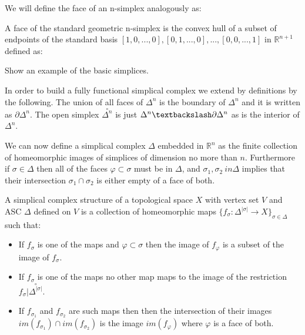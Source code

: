 We will define the face of an n-simplex analogously as:

\begin{defn} A face of the standard geometric n-simplex is the convex hull of a subset of endpoints of the standard basis $[1, 0, ..., 0], [0, 1, ..., 0], ..., [0, 0, ..., 1]$ in $\mathbb{R}^{n+1}$ defined as: \end{defn}

\begin{ex} Show an example of the basic simplices. \end{ex}



In order to build a fully functional simplical complex we extend by definitions by the following. The union of all faces of $\Delta^n$ is the boundary of $\Delta^n$ and it is written as $\partial \Delta^n$. The open simplex $\overset{\circ}{\Delta^n}$ is just $\Delta^n \textbackslash \partial \Delta^n$ as is the interior of $\Delta^n$.


We can now define a simplical complex $\Delta$ embedded in $\mathbb{R}^n$ as the finite collection of homeomorphic images of simplices of dimension no more than $n$. Furthermore if $\sigma \in \Delta$ then all of the faces $\varphi \subset \sigma$ must be in $\Delta$, and $\sigma_1, \sigma_2 \ in \Delta$ implies that their intersection $\sigma_1 \cap \sigma_2$ is either empty of a face of both.




A simplical complex structure of a topological space $X$ with vertex set $V$ and ASC $\Delta$ defined on $V$ is a collection of homeomorphic maps $\{f_\sigma : \Delta^{|\sigma|} \to X\}_{\sigma \in \Delta}$ such that:


\begin{itemize}
    \item If $f_\sigma$ is one of the maps and $\varphi \subset \sigma$ then the image of $f_\varphi$ is a subset of the image of $f_\sigma$.
    \item If $f_\sigma$ is one of the maps no other map maps to the image of the restriction $f_\sigma | \overset{\circ}{\Delta^{|\sigma|}}$.
    \item If $f_{\sigma_1}$ and $f_{\sigma_2}$ are such maps then then the intersection of their images $im(f_{\sigma_1}) \cap im(f_{\sigma_2})$ is the image $im(f_\varphi)$ where $\varphi$ is a face of both. 

\end{itemize}


